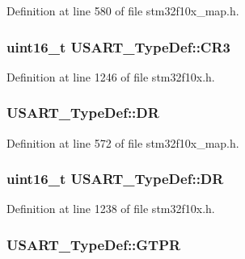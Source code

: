 Definition at line 580 of file stm32f10x\+\_\+map.\+h.

\subsubsection[{\texorpdfstring{C\+R3}{CR3}}]{ {\bf uint16\+\_\+t} U\+S\+A\+R\+T\+\_\+\+Type\+Def\+::\+C\+R3}\hypertarget{struct_u_s_a_r_t___type_def_a2b9d1df38cb1d745305c8190a8707a0f}{}\label{struct_u_s_a_r_t___type_def_a2b9d1df38cb1d745305c8190a8707a0f}


Definition at line 1246 of file stm32f10x.\+h.

\subsubsection[{\texorpdfstring{DR}{DR}}]{ U\+S\+A\+R\+T\+\_\+\+Type\+Def\+::\+DR}\hypertarget{struct_u_s_a_r_t___type_def_a0211523095685c0b4f91bf7e1e6e0984}{}\label{struct_u_s_a_r_t___type_def_a0211523095685c0b4f91bf7e1e6e0984}


Definition at line 572 of file stm32f10x\+\_\+map.\+h.

\subsubsection[{\texorpdfstring{DR}{DR}}]{ {\bf uint16\+\_\+t} U\+S\+A\+R\+T\+\_\+\+Type\+Def\+::\+DR}\hypertarget{struct_u_s_a_r_t___type_def_accee34aaec89aad4aeef512bba173ae5}{}\label{struct_u_s_a_r_t___type_def_accee34aaec89aad4aeef512bba173ae5}


Definition at line 1238 of file stm32f10x.\+h.

\subsubsection[{\texorpdfstring{G\+T\+PR}{GTPR}}]{ U\+S\+A\+R\+T\+\_\+\+Type\+Def\+::\+G\+T\+PR}\hypertarget{struct_u_s_a_r_t___type_def_a8cd2c70a430ca3ff58cf880f8c918a6f}{}\label{struct_u_s_a_r_t___type_def_a8cd2c70a430ca3ff58cf880f8c918a6f}


